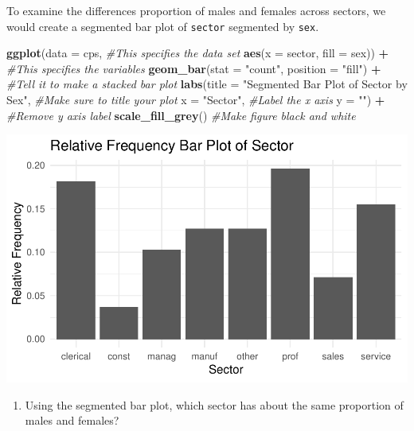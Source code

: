 \documentclass[
]{report}
\newenvironment{Shaded}{\begin{snugshade}}{\end{snugshade}}
\newcommand{\CommentTok}[1]{\textcolor[rgb]{0.56,0.35,0.01}{\textit{#1}}}
\newcommand{\DataTypeTok}[1]{\textcolor[rgb]{0.13,0.29,0.53}{#1}}
\newcommand{\KeywordTok}[1]{\textcolor[rgb]{0.13,0.29,0.53}{\textbf{#1}}}
\newcommand{\NormalTok}[1]{#1}
\newcommand{\OperatorTok}[1]{\textcolor[rgb]{0.81,0.36,0.00}{\textbf{#1}}}
\newcommand{\StringTok}[1]{\textcolor[rgb]{0.31,0.60,0.02}{#1}}
\providecommand{\tightlist}{%
  \setlength{\itemsep}{0pt}\setlength{\parskip}{0pt}}
\begin{document}
To examine the differences proportion of males and females across sectors, we would create a segmented bar plot of \texttt{sector} segmented by \texttt{sex}.

\begin{Shaded}
\begin{Highlighting}[]
\KeywordTok{ggplot}\NormalTok{(}\DataTypeTok{data =}\NormalTok{ cps,   }\CommentTok{\#This specifies the data set}
       \KeywordTok{aes}\NormalTok{(}\DataTypeTok{x =}\NormalTok{ sector, }\DataTypeTok{fill =}\NormalTok{ sex)) }\OperatorTok{+}\StringTok{   }\CommentTok{\#This specifies the variables}
\StringTok{  }\KeywordTok{geom\_bar}\NormalTok{(}\DataTypeTok{stat =} \StringTok{"count"}\NormalTok{, }\DataTypeTok{position =} \StringTok{"fill"}\NormalTok{) }\OperatorTok{+}\StringTok{  }\CommentTok{\#Tell it to make a stacked bar plot}
\StringTok{  }\KeywordTok{labs}\NormalTok{(}\DataTypeTok{title =} \StringTok{"Segmented Bar Plot of Sector by Sex"}\NormalTok{,  }\CommentTok{\#Make sure to title your plot }
       \DataTypeTok{x =} \StringTok{"Sector"}\NormalTok{,   }\CommentTok{\#Label the x axis}
       \DataTypeTok{y =} \StringTok{""}\NormalTok{) }\OperatorTok{+}\StringTok{  }\CommentTok{\#Remove y axis label}
\StringTok{    }\KeywordTok{scale\_fill\_grey}\NormalTok{()  }\CommentTok{\#Make figure black and white}
\end{Highlighting}
\end{Shaded}

\begin{center}\includegraphics[width=0.6\linewidth]{03-EDA-categorical_files/figure-latex/unnamed-chunk-4-1} \end{center}

\begin{enumerate}
\def\labelenumi{\arabic{enumi}.}
\setcounter{enumi}{5}
\tightlist
\item
  Using the segmented bar plot, which sector has about the same proportion of males and females?
\end{enumerate}
\end{document}

